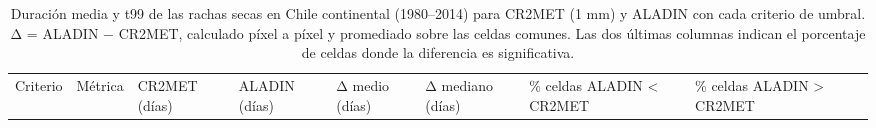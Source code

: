 \begin{longtable}[]{@{}
  >{\raggedright\arraybackslash}p{}
  >{\raggedright\arraybackslash}p{}
  >{\raggedright\arraybackslash}p{}
  >{\raggedright\arraybackslash}p{}
  >{\raggedright\arraybackslash}p{}
  >{\raggedright\arraybackslash}p{}
  >{\raggedright\arraybackslash}p{}
  >{\raggedright\arraybackslash}p{}
  >{\raggedright\arraybackslash}p{}@{}}
\caption[Duración media y t99 de las rachas secas en Chile continental (1980--2014) para CR2MET (1 mm) y ALADIN con cada criterio de umbral]{Duración media y t99 de las rachas secas en Chile continental (1980--2014) para CR2MET (1 mm) y ALADIN con cada criterio de umbral. Δ = ALADIN − CR2MET, calculado píxel a píxel y promediado sobre las celdas comunes. Las dos últimas columnas indican el porcentaje de celdas donde la diferencia es significativa.}\label{tab:S1}\tabularnewline
\toprule\noalign{}
\begin{minipage}[b]{\linewidth}\raggedright
Criterio
\end{minipage} & \begin{minipage}[b]{\linewidth}\raggedright
Métrica
\end{minipage} & \begin{minipage}[b]{\linewidth}\raggedright
CR2MET (días)
\end{minipage} & \begin{minipage}[b]{\linewidth}\raggedright
ALADIN (días)
\end{minipage} & \begin{minipage}[b]{\linewidth}\raggedright
Δ medio (días)
\end{minipage} & \begin{minipage}[b]{\linewidth}\raggedright
Δ mediano (días)
\end{minipage} & \begin{minipage}[b]{\linewidth}\raggedright
\% celdas ALADIN \textless{} CR2MET
\end{minipage} & \begin{minipage}[b]{\linewidth}\raggedright
\% celdas ALADIN \textgreater{} CR2MET
\end{minipage} & \begin{minipage}[b]{\linewidth}\raggedright

\end{minipage}
\end{longtable}
